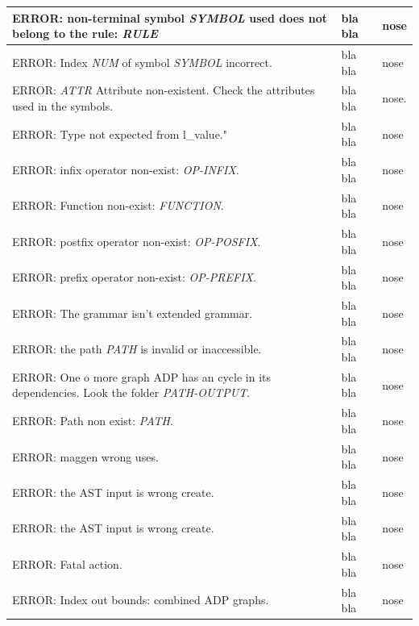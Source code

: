 \begin{longtable}{| p{5cm} || p{5cm} | p{5cm} |}
ERROR: non-terminal symbol \textit{SYMBOL} used does not belong to the rule: \textit{RULE} & bla bla & nose \\ \hline
ERROR: Index \textit{NUM} of symbol  \textit{SYMBOL} incorrect. & bla bla & nose \\ \hline 
ERROR: \textit{ATTR} Attribute non-existent. Check the attributes used in the symbols. & bla bla & nose. \\ \hline
ERROR: Type not expected from l\_value." & bla bla & nose \\ \hline 
ERROR: infix operator non-exist: \textit{OP-INFIX}. & bla bla & nose \\ \hline 
ERROR: Function non-exist: \textit{FUNCTION}. & bla bla & nose \\ \hline 
ERROR: postfix operator non-exist: \textit{OP-POSFIX}. & bla bla & nose \\ \hline 
ERROR: prefix operator non-exist: \textit{OP-PREFIX}. & bla bla & nose \\ \hline 
ERROR: The grammar isn't extended grammar. & bla bla & nose \\ \hline
ERROR: the path \textit{PATH} is invalid or inaccessible. & bla bla & nose \\ \hline
ERROR: One o more graph ADP has an cycle in its dependencies. Look the folder \textit{PATH-OUTPUT}. & bla bla & nose \\ \hline 
ERROR: Path non exist: \textit{PATH}. & bla bla & nose \\ \hline 
ERROR: maggen wrong uses. & bla bla & nose \\ \hline




ERROR: the AST input is wrong create. & bla bla & nose \\ \hline
ERROR: the AST input is wrong create. & bla bla & nose \\ \hline
ERROR: Fatal action. & bla bla & nose \\ \hline
ERROR: Index out bounds: combined ADP graphs.& bla bla & nose \\ 
\hline 

\end{longtable}
